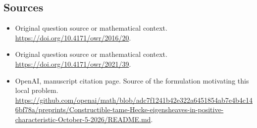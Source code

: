 \documentclass[11pt]{article}
\begin{document}
\subsection{Sources}
\begin{itemize}
\item[S1] Original question source or mathematical context.
\url{https://doi.org/10.4171/owr/2016/20}.
\item[S2] Original question source or mathematical context.
\url{https://doi.org/10.4171/owr/2021/39}.
\item[S3] OpenAI, manuscript citation page. Source of the formulation motivating this local problem.
\url{https://github.com/openai/math/blob/adc7f1241b42e322a6451854ab7e4b4c146bf78a/preprints/Constructible-tame-Hecke-eigensheaves-in-positive-characteristic-October-5-2026/README.md}.
\end{itemize}
\end{document}
